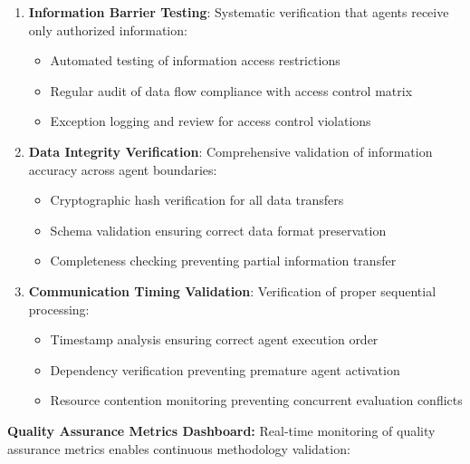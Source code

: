 \begin{enumerate}
    \item \textbf{Information Barrier Testing}: Systematic verification that agents receive only authorized information:
    \begin{itemize}
        \item Automated testing of information access restrictions
        \item Regular audit of data flow compliance with access control matrix
        \item Exception logging and review for access control violations
    \end{itemize}
    
    \item \textbf{Data Integrity Verification}: Comprehensive validation of information accuracy across agent boundaries:
    \begin{itemize}
        \item Cryptographic hash verification for all data transfers
        \item Schema validation ensuring correct data format preservation
        \item Completeness checking preventing partial information transfer
    \end{itemize}
    
    \item \textbf{Communication Timing Validation}: Verification of proper sequential processing:
    \begin{itemize}
        \item Timestamp analysis ensuring correct agent execution order
        \item Dependency verification preventing premature agent activation
        \item Resource contention monitoring preventing concurrent evaluation conflicts
    \end{itemize}
\end{enumerate}

\textbf{Quality Assurance Metrics Dashboard:}
Real-time monitoring of quality assurance metrics enables continuous methodology validation:

